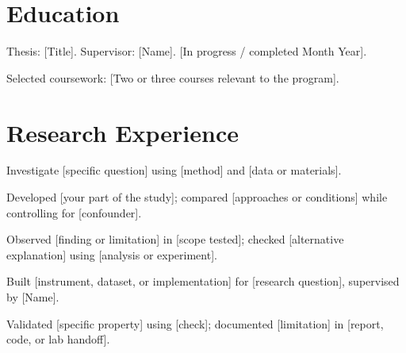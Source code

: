 \documentclass{resume}
\begin{document}

\section{Education}

\begin{jobduties}
  \item Thesis: [Title]. Supervisor: [Name]. [In progress / completed Month Year].
  \item Selected coursework: [Two or three courses relevant to the program].
\end{jobduties}

\section{Research Experience}

\begin{jobduties}
  \item Investigate [specific question] using [method] and [data or materials].
  \item Developed [your part of the study]; compared [approaches or conditions] while controlling for [confounder].
  \item Observed [finding or limitation] in [scope tested]; checked [alternative explanation] using [analysis or experiment].
\end{jobduties}

\begin{jobduties}
  \item Built [instrument, dataset, or implementation] for [research question], supervised by [Name].
  \item Validated [specific property] using [check]; documented [limitation] in [report, code, or lab handoff].
\end{jobduties}
\end{document}
